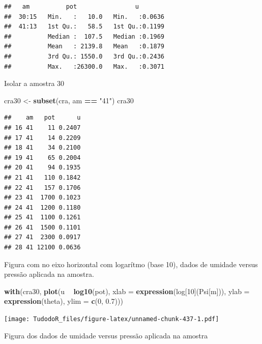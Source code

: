 \documentclass[
]{book}
\newenvironment{Shaded}{\begin{snugshade}}{\end{snugshade}}
\newcommand{\DataTypeTok}[1]{\textcolor[rgb]{0.13,0.29,0.53}{#1}}
\newcommand{\DecValTok}[1]{\textcolor[rgb]{0.00,0.00,0.81}{#1}}
\newcommand{\FloatTok}[1]{\textcolor[rgb]{0.00,0.00,0.81}{#1}}
\newcommand{\KeywordTok}[1]{\textcolor[rgb]{0.13,0.29,0.53}{\textbf{#1}}}
\newcommand{\NormalTok}[1]{#1}
\newcommand{\OperatorTok}[1]{\textcolor[rgb]{0.81,0.36,0.00}{\textbf{#1}}}
\newcommand{\StringTok}[1]{\textcolor[rgb]{0.31,0.60,0.02}{#1}}
\begin{document}
\begin{verbatim}
##   am          pot                u         
##  30:15   Min.   :   10.0   Min.   :0.0636  
##  41:13   1st Qu.:   58.5   1st Qu.:0.1199  
##          Median :  107.5   Median :0.1969  
##          Mean   : 2139.8   Mean   :0.1879  
##          3rd Qu.: 1550.0   3rd Qu.:0.2436  
##          Max.   :26300.0   Max.   :0.3071
\end{verbatim}

Isolar a amostra 30

\begin{Shaded}
\begin{Highlighting}[]
\NormalTok{cra30 <-}\StringTok{ }\KeywordTok{subset}\NormalTok{(cra, am }\OperatorTok{==}\StringTok{ "41"}\NormalTok{)}
\NormalTok{cra30}
\end{Highlighting}
\end{Shaded}

\begin{verbatim}
##    am   pot      u
## 16 41    11 0.2407
## 17 41    14 0.2209
## 18 41    34 0.2100
## 19 41    65 0.2004
## 20 41    94 0.1935
## 21 41   110 0.1842
## 22 41   157 0.1706
## 23 41  1700 0.1023
## 24 41  1200 0.1180
## 25 41  1100 0.1261
## 26 41  1500 0.1101
## 27 41  2300 0.0917
## 28 41 12100 0.0636
\end{verbatim}

Figura com no eixo horizontal com logarítmo (base 10), dados de umidade versus pressão aplicada na amostra.

\begin{Shaded}
\begin{Highlighting}[]
\KeywordTok{with}\NormalTok{(cra30, }\KeywordTok{plot}\NormalTok{(u }\OperatorTok{~}\StringTok{ }\KeywordTok{log10}\NormalTok{(pot), }\DataTypeTok{xlab =} \KeywordTok{expression}\NormalTok{(log[}\DecValTok{10}\NormalTok{](Psi[m])), }\DataTypeTok{ylab =} \KeywordTok{expression}\NormalTok{(theta), }\DataTypeTok{ylim =} \KeywordTok{c}\NormalTok{(}\DecValTok{0}\NormalTok{, }\FloatTok{0.7}\NormalTok{)))}
\end{Highlighting}
\end{Shaded}

\texttt{[image: TudodoR\_files/figure-latex/unnamed-chunk-437-1.pdf]}

Figura dos dados de umidade versus pressão aplicada na amostra
\end{document}
